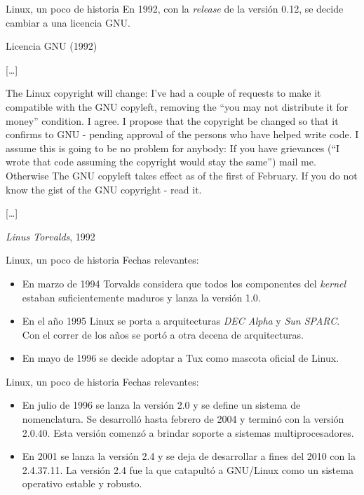 \begin{frame}{Linux, un poco de historia}
  \small En 1992, con la \textit{release} de la versión 0.12, se decide
  cambiar a una licencia GNU.

\begin{block}{Licencia GNU \hfill (1992)}
  {\small

  [\ldots]

  The Linux copyright will change: I've had a couple of requests to make it
  compatible with the GNU copyleft, removing the ``you may not distribute
  it for money'' condition.  I agree.  I propose that the copyright be
  changed so that it confirms to GNU - pending approval of the persons who
  have helped write code.  I assume this is going to be no problem for
  anybody: If you have grievances (``I wrote that code assuming the
  copyright would stay the same'') mail me.  Otherwise The GNU copyleft
  takes effect as of the first of February.  If you do not know the gist of
  the GNU copyright - read it.

  [\ldots]

  }

  \hfill \emph{Linus Torvalds}, 1992 \cite{Torvalds1992-2}
\end{block}
\end{frame}

\begin{frame}{Linux, un poco de historia}
Fechas relevantes:
\begin{itemize}
\item En marzo de 1994 Torvalds considera que todos los componentes del
  \textit{kernel} estaban suficientemente maduros y lanza la versión 1.0.

\item En el año 1995 Linux se porta a arquitecturas \textit{DEC Alpha} y
  \textit{Sun SPARC}. Con el correr de los años se portó a otra decena de
   arquitecturas.

\item En mayo de 1996 se decide adoptar a Tux como mascota oficial de
  Linux.
\end{itemize}
\end{frame}

\begin{frame}{Linux, un poco de historia}
Fechas relevantes:
  \begin{itemize}
\item En julio de 1996 se lanza la versión 2.0 y se define un sistema de
  nomenclatura. Se desarrolló hasta febrero de 2004 y terminó con la
  versión 2.0.40. Esta versión comenzó a brindar soporte a sistemas
  multiprocesadores.

\item En 2001 se lanza la versión 2.4 y se deja de desarrollar a fines del
  2010 con la 2.4.37.11. La versión 2.4 fue la que catapultó a GNU/Linux
  como un sistema operativo estable y robusto.
\end{itemize}
\end{frame}

